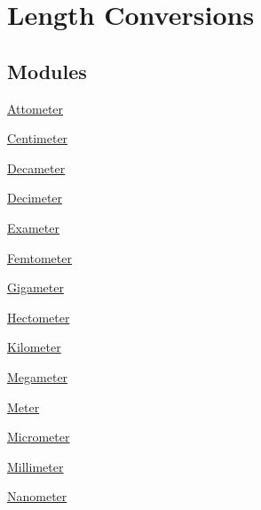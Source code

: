 \hypertarget{group___e_g_x_math-_conversions-_length_conversions}{}\section{Length Conversions}
\label{group___e_g_x_math-_conversions-_length_conversions}
\subsection*{Modules}
\begin{DoxyCompactItemize}
\item 
\mbox{\hyperlink{group___e_g_x_math-_conversions-_length_conversions-_attometer}{Attometer}}
\item 
\mbox{\hyperlink{group___e_g_x_math-_conversions-_length_conversions-_centimeter}{Centimeter}}
\item 
\mbox{\hyperlink{group___e_g_x_math-_conversions-_length_conversions-_decameter}{Decameter}}
\item 
\mbox{\hyperlink{group___e_g_x_math-_conversions-_length_conversions-_decimeter}{Decimeter}}
\item 
\mbox{\hyperlink{group___e_g_x_math-_conversions-_length_conversions-_exameter}{Exameter}}
\item 
\mbox{\hyperlink{group___e_g_x_math-_conversions-_length_conversions-_femtometer}{Femtometer}}
\item 
\mbox{\hyperlink{group___e_g_x_math-_conversions-_length_conversions-_gigameter}{Gigameter}}
\item 
\mbox{\hyperlink{group___e_g_x_math-_conversions-_length_conversions-_hectometer}{Hectometer}}
\item 
\mbox{\hyperlink{group___e_g_x_math-_conversions-_length_conversions-_kilometer}{Kilometer}}
\item 
\mbox{\hyperlink{group___e_g_x_math-_conversions-_length_conversions-_megameter}{Megameter}}
\item 
\mbox{\hyperlink{group___e_g_x_math-_conversions-_length_conversions-_meter}{Meter}}
\item 
\mbox{\hyperlink{group___e_g_x_math-_conversions-_length_conversions-_micrometer}{Micrometer}}
\item 
\mbox{\hyperlink{group___e_g_x_math-_conversions-_length_conversions-_millimeter}{Millimeter}}
\item 
\mbox{\hyperlink{group___e_g_x_math-_conversions-_length_conversions-_nanometer}{Nanometer}}
\item 

\end{DoxyCompactItemize}
